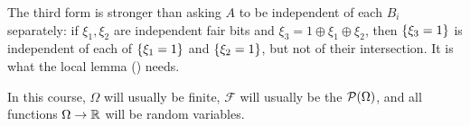 The third form is stronger than asking $A$ to be independent of each $B_i$ separately: if $\xi_1, \xi_2$ are independent fair bits and $\xi_3 = 1 \oplus \xi_1 \oplus \xi_2$, then $\left\{ \xi_3 = 1 \right\}$ is independent of each of $\left\{ \xi_1 = 1 \right\}$ and $\left\{ \xi_2 = 1 \right\}$, but not of their intersection. It is what the \Lovasz{} local lemma () needs.

In this course, $\Omega$ will usually be finite, $\mathcal{F}$ will usually be the $\mathcal{P}\!\left( \Omega \right)$, and all functions $\Omega \to \mathbb{R}$ will be random variables.
